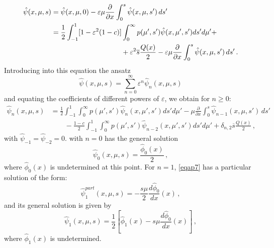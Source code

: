\documentclass[12pt]{article}
\newcommand{\eps}{\varepsilon}
\begin{document}
{\begin{align}
      \hat\psi( x, \mu, s)  &= \hat\psi(x,\mu, 0) - \varepsilon \mu\frac{\partial}{\partial x} \int_0^s \hat\psi(x, \mu, s') \, ds' \\
      & = \frac{1}{2}\int_{-1}^1 [1-\eps^2(1-c)] \int_0^{\infty} p(\mu',s')
\hat\psi(x, \mu', s') ds' d\mu' + \nonumber\\
         &\hspace{3.5cm} + \varepsilon^2 \overline{s} \frac{Q(x)}{2} - \varepsilon \mu\frac{\partial}{\partial x} \int_0^s \hat\psi(x, \mu, s') \, ds' \,.\nonumber
   \end{align}
Introducing into this equation the ansatz 
   \begin{equation}
 \hat\psi(x, \mu, s) =  \sum_{n=0}^{\infty} \varepsilon^n
       \hat\psi_n(x, \mu, s) 
       \end{equation}
and equating the coefficients of different powers of $\varepsilon$, we obtain for $n \ge 0$:
   \begin{align}\label{eqap7}
\hat\psi_n(x,\mu, s) &= \frac{1}{2}\int_{-1}^1 \int_0^{\infty} p(\mu',s')
\hat\psi_n(x, \mu', s') ds' d\mu'  - \mu\frac{\partial}{\partial x} \int_0^s \hat\psi_{n-1}(x, \mu, s') \, ds' \\
& \quad\quad -\frac{1-c}{2}\int_{-1}^1 \int_0^{\infty} p(\mu',s')
\hat\psi_{n-2}(x, \mu', s') ds' d\mu' + \delta_{n,2} \overline{s} \frac{Q( x)}{2} \,, 
   \nonumber
   \end{align}
with $\hat\psi_{-1}=\hat\psi_{-2}=0$.  with $n=0$ has the general solution
   \begin{equation}
      \hat\psi_0(x, \mu, s) = \frac{\hat\phi_0(x)}{2} \,,
   \end{equation}
where $\hat\phi_0(x)$ is undetermined at this point. For $n=1$,
\cref{eqap7} has a particular solution of the form:
    \begin{equation}
      \hat\psi^{part}_1(x, \mu, s) = - \frac{s\mu}{2}\frac{d \hat\phi_0}{d x}(x) \,,
   \end{equation}   
and its general solution is given by 
   \begin{equation}
      \hat\psi_1( x, \mu, s) =  \frac{1}{2}\left[\hat\phi_1( x) - s\mu\frac{d \hat\phi_0}{d x}(x)\right] \,,
  \end{equation}  
where $\hat\phi_1(x)$ is undetermined.

}
\end{document}
